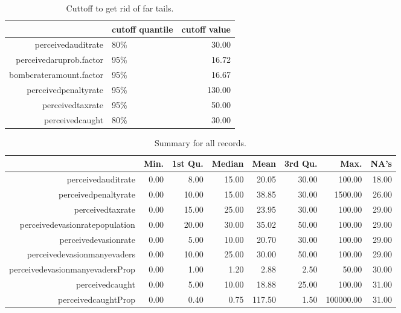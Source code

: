 
\begin{table}[ht]
\footnotesize
\centering
\begin{tabular}{rlr}
  \hline
 & cutoff quantile & cutoff value \\ 
  \hline
perceivedauditrate & 80\% & 30.00 \\ 
  perceivedaruprob.factor & 95\% & 16.72 \\ 
  bombcrateramount.factor & 95\% & 16.67 \\ 
  perceivedpenaltyrate & 95\% & 130.00 \\ 
  perceivedtaxrate & 95\% & 50.00 \\ 
  perceivedcaught & 80\% & 30.00 \\ 
   \hline
\end{tabular}
\caption{\label{tab:cut-offs} Cuttoff to get rid of far tails.}
\end{table}



\begin{table}[ht]
\footnotesize
\centering
\begin{tabular}{rrrrrrrr}
  \hline
 & Min. & 1st Qu. & Median & Mean & 3rd Qu. & Max. & NA's \\ 
  \hline
perceivedauditrate & 0.00 & 8.00 & 15.00 & 20.05 & 30.00 & 100.00 & 18.00 \\ 
  perceivedpenaltyrate & 0.00 & 10.00 & 15.00 & 38.85 & 30.00 & 1500.00 & 26.00 \\ 
  perceivedtaxrate & 0.00 & 15.00 & 25.00 & 23.95 & 30.00 & 100.00 & 29.00 \\ 
  perceivedevasionratepopulation & 0.00 & 20.00 & 30.00 & 35.02 & 50.00 & 100.00 & 29.00 \\ 
  perceivedevasionrate & 0.00 & 5.00 & 10.00 & 20.70 & 30.00 & 100.00 & 29.00 \\ 
  perceivedevasionmanyevaders & 0.00 & 10.00 & 25.00 & 30.00 & 50.00 & 100.00 & 29.00 \\ 
  perceivedevasionmanyevadersProp & 0.00 & 1.00 & 1.20 & 2.88 & 2.50 & 50.00 & 30.00 \\ 
  perceivedcaught & 0.00 & 5.00 & 10.00 & 18.88 & 25.00 & 100.00 & 31.00 \\ 
  perceivedcaughtProp & 0.00 & 0.40 & 0.75 & 117.50 & 1.50 & 100000.00 & 31.00 \\ 
   \hline
\end{tabular}
\caption{\label{tab:perceptions_summary_all} Summary for  all records.}
\end{table}



